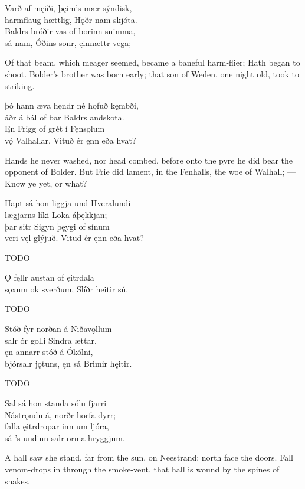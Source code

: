\bva Varð af męiði, \hld þęim’s mær sýndisk, \\%
harmflaug hættlig, \hld Hǫðr nam skjóta. \\%
Baldrs bróðir vas \hld of borinn snimma, \\%
sá nam, Óðins sonr, \hld ęinnættr vega;\eva

\bvb Of that beam, which meager seemed, became a baneful harm-flier; Hath began to shoot. Bolder’s brother was born early; that son of Weden, one night old, took to striking.\evb

\bva þó hann æva hęndr \hld né hǫfuð kęmbði, \\%
áðr á bál of bar \hld Baldrs andskota. \\%
Ęn Frigg of grét \hld í Fęnsǫlum \\%
vǫ́ Valhallar. \hld Vituð ér ęnn eða hvat?\eva

\bvb Hands he never washed, nor head combed, before onto the pyre he did bear the opponent of Bolder. But Frie did lament, in the Fenhalls, the woe of Walhall; — Know ye yet, or what?\evb

\bva Hapt sá hon liggja \hld und Hveralundi \\%
lægjarns líki \hld Loka áþękkjan; \\%
þar sitr Sigyn \hld þęygi of sínum \\%
veri vęl glýjuð. \hld Vitud ér ęnn eða hvat?\eva

\bvb TODO\evb

\bva Ǫ́ fęllr austan \hld of ęitrdala \\%
sǫxum ok sverðum, \hld Slíðr heitir sú.\eva

\bvb TODO\evb

\bva Stóð fyr norðan \hld á Niðavǫllum \\%
salr ór golli \hld Sindra ættar, \\%
ęn annarr stóð \hld á Ókólni, \\%
bjórsalr jǫtuns, \hld ęn sá Brimir hęitir.\eva

\bvb TODO\evb

\bva Sal sá hon standa \hld sólu fjarri \\%
Nástrǫndu á, \hld norðr horfa dyrr; \\%
falla ęitrdropar \hld inn um ljóra, \\%
sá ’s undinn salr \hld orma hryggjum.\eva

\bvb A hall saw she stand, far from the sun, on Neestrand; north face the doors. Fall venom-drops in through the smoke-vent, that hall is wound by the spines of snakes.\evb

